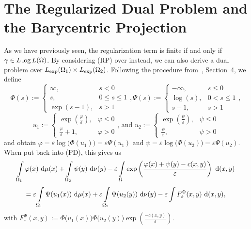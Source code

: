 \section{The Regularized Dual Problem and the Barycentric Projection}\label{RegDualBaryProj}

As we have previously seen, the regularization term is finite if and only if $\gamma \in \LLL$. By considering (RP) over \LLL{} instead, we can also derive a dual problem over $\Lexp[\Omega_1] \times \Lexp[\Omega_2]$. Following the procedure from~\cite{Cla2021}, Section~4, we define
\[ \Phi(s) := \begin{cases}
	\infty, & s < 0 \\
	s, & 0 \le s \le 1 \\
	\exp(s - 1), & s > 1
\end{cases}, \Psi(s) := \begin{cases}
	- \infty, & s \le 0 \\
	\log(s), & 0 < s \le 1 \\
	s - 1, & s > 1
\end{cases}, \]
\[ u_1 := \begin{cases}
	\exp \left( \frac{\varphi}{\varepsilon} \right), & \varphi \le 0 \\
	\frac{\varphi}{\varepsilon} + 1, & \varphi > 0
\end{cases} \text{, and } u_2 := \begin{cases}
	\exp \left( \frac{\psi}{\varepsilon} \right), & \psi \le 0 \\
	\frac{\psi}{\varepsilon}, & \psi > 0
\end{cases} \]
and obtain $\varphi = \varepsilon \log \big( \Phi(u_1) \big) = \varepsilon \Psi(u_1) \text{ and } \psi = \varepsilon \log \big( \Phi(u_2) \big) = \varepsilon \Psi(u_2)$. When put back into (PD), this gives us
\[ \int\limits_{\Omega_1} \varphi(x)~\Dx{\mu} + \int\limits_{\Omega_2} \psi(y)~\Dx[y]{\nu} - \varepsilon \int\limits_{\Omega} \exp \left( \frac{\varphi(x) + \psi(y) - c(x, y)}{\varepsilon} \right)~\Dx[x, y]{} \]
\[ = \varepsilon \int\limits_{\Omega_1} \Psi(u_1(x))~\Dx{\mu} + \varepsilon \int\limits_{\Omega_2} \Psi(u_2(y))~\Dx[y]{\nu} - \varepsilon \int\limits F_{\varepsilon}^{\Phi}(x, y)~\Dx[x, y]{}, \]
with $F_{\varepsilon}^{\Phi}(x, y) := \Phi\big( u_1(x) \big) \Phi\big( u_2(y) \big) \exp\left( \frac{-c(x, y)}{\varepsilon} \right)$.


